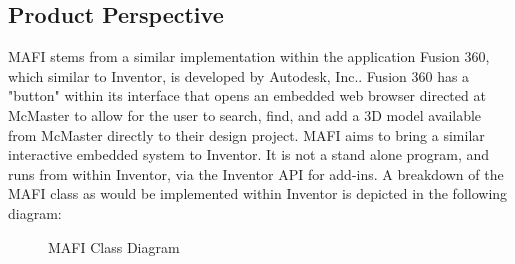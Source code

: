 \documentclass[12pt, letterpaper]{article}
\begin{document}
\subsection{Product Perspective}
MAFI stems from a similar implementation within the application Fusion 360, which similar to Inventor, is developed by Autodesk, Inc.. Fusion 360 
has a "button" within its interface that opens an embedded web browser directed at McMaster to allow for the user to search, find, and add a 3D model 
available from McMaster directly to their design project. MAFI aims to bring a similar interactive embedded system to Inventor. It is not a stand alone 
program, and runs from within Inventor, via the Inventor API for add-ins. A breakdown of the MAFI class as would be implemented within Inventor is depicted 
in the following diagram:
\begin{figure}
    \begin{center}
    \end{center}
    \caption{MAFI Class Diagram}
\end{figure}
\end{document}
